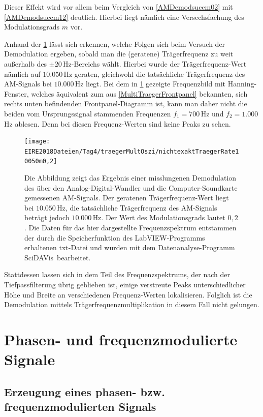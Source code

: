 \documentclass[
a4paper,
12pt,
pagesize,
ngerman
]{scrartcl}
\begin{document}
	\noindent Dieser Effekt wird vor allem beim Vergleich von \cref{AMDemodsuccm02} mit \cref{AMDemodsuccm12} deutlich. 
	Hierbei liegt nämlich eine Versechsfachung des Modulationsgrads $m$ vor. %
	
	Anhand der \cref{AMDemodfailm02} lässt sich erkennen, welche Folgen sich beim Versuch der Demodulation ergeben, sobald man die (geratene) Trägerfrequenz zu weit außerhalb des $\pm 20\,$Hz-Bereichs wählt.
	Hierbei wurde der Trägerfrequenz-Wert nämlich auf $10.050\,$Hz geraten, gleichwohl die tatsächliche Trägerfrequenz des AM-Signals bei $10.000\,$Hz liegt.
	Bei dem in \cref{AMDemodfailm02} gezeigte Frequenzbild mit Hanning-Fenster, welches äquivalent zum aus \cref{MultiTraegerFrontpanel} bekannten, sich rechts unten befindenden Frontpanel-Diagramm ist, kann man daher nicht die beiden vom Ursprungssignal stammenden Frequenzen $f_1 = 700\,$Hz und $f_2 = 1.000\,$Hz ablesen.
	Denn bei diesen Frequenz-Werten sind keine Peaks zu sehen.
	
	\begin{figure}[H]
		\centering
		\texttt{[image: EIRE2018Dateien/Tag4/traegerMultOszi/nichtexaktTraegerRate10050m0,2]}
		\caption{Die Abbildung zeigt das Ergebnis einer misslungenen Demodulation des über den Analog-Digital-Wandler und die Computer-Soundkarte gemessenen AM-Signals. Der geratenen Trägerfrequenz-Wert liegt bei $10.050\,$Hz, die tatsächliche Trägerfrequenz des AM-Signals beträgt jedoch $10.000\,$Hz. Der Wert des Modulationsgrads lautet $0,2$. Die Daten für das hier dargestellte Frequenzspektrum entstammen der durch die Speicherfunktion des LabVIEW-Programms erhaltenen txt-Datei und wurden mit dem Datenanalyse-Programm \glqq SciDAVis\grqq\ bearbeitet.}
		\label{AMDemodfailm02}
	\end{figure}

	\noindent Stattdessen lassen sich in dem Teil des Frequenzspektrums, der nach der Tiefpassfilterung übrig geblieben ist, einige verstreute Peaks unterschiedlicher Höhe und Breite an verschiedenen Frequenz-Werten lokalisieren.
	Folglich ist die Demodulation mittels Trägerfrequenzmultiplikation in diesem Fall nicht gelungen.
	
	
	\section{Phasen- und frequenzmodulierte Signale}

	\subsection{Erzeugung eines phasen- bzw. frequenzmodulierten Signals} \label{FMPMErzeugung}
		
\end{document}

